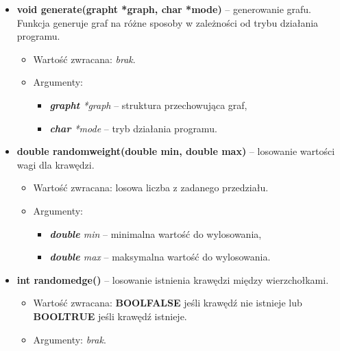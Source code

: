 \documentclass{article}
\begin{document}
\begin{itemize}
    \item \textbf{void generate(graph\textunderscore t *graph, char *mode)} -- generowanie grafu. Funkcja generuje graf na różne sposoby w zależności od trybu działania programu.
    \begin{itemize}
        \item Wartość zwracana: \textit{brak}.
        \item Argumenty:
            \begin{itemize}
                \item \textit{\textbf{graph\textunderscore t} *graph} -- struktura przechowująca graf,
                \item \textit{\textbf{char} *mode} -- tryb działania programu.
            \end{itemize}
    \end{itemize}
    
\newpage
    
    \item \textbf{double random\textunderscore weight(double min, double max)} -- losowanie wartości wagi dla krawędzi.
    \begin{itemize}
        \item Wartość zwracana: losowa liczba z zadanego przedziału.
        \item Argumenty:
            \begin{itemize}
                \item \textit{\textbf{double} min} -- minimalna wartość do wylosowania,
                \item \textit{\textbf{double} max} -- maksymalna wartość do wylosowania.
            \end{itemize}
    \end{itemize}
    
    \item \textbf{int random\textunderscore edge()} -- losowanie istnienia krawędzi między wierzchołkami.
    \begin{itemize}
        \item Wartość zwracana: \textbf{BOOL\textunderscore FALSE} jeśli krawędź nie istnieje \linebreak lub \textbf{BOOL\textunderscore TRUE} jeśli krawędź istnieje.
        \item Argumenty: \textit{brak}.
    \end{itemize}
    

\end{itemize}
\end{document}
